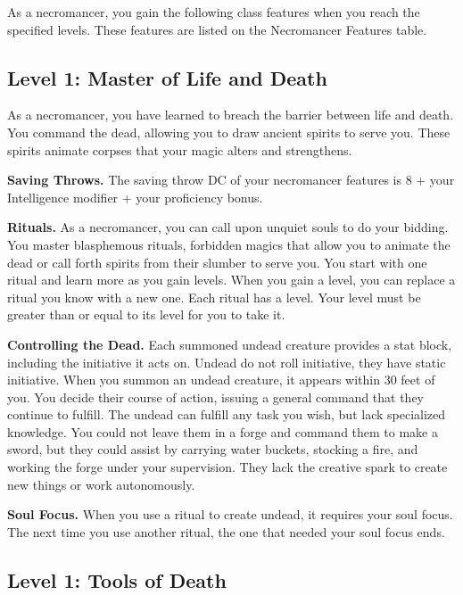 \documentclass[12pt,letterpaper,twocolumn,openany,nodeprecatedcode,bg=none]{dndbook}
\begin{document}
As a necromancer, you gain the following class features when you reach
the specified levels. These features are listed on the Necromancer
Features table.

\subsection{Level 1: Master of Life and
Death}\label{level-1-master-of-life-and-death}

As a necromancer, you have learned to breach the barrier between life
and death. You command the dead, allowing you to draw ancient spirits to
serve you. These spirits animate corpses that your magic alters and
strengthens.

\textbf{Saving Throws.} The saving throw DC of your necromancer features
is 8 + your Intelligence modifier + your proficiency bonus.

\textbf{Rituals.} As a necromancer, you can call upon unquiet souls to
do your bidding. You master blasphemous rituals, forbidden magics that
allow you to animate the dead or call forth spirits from their slumber
to serve you. You start with one ritual and learn more as you gain
levels. When you gain a level, you can replace a ritual you know with a
new one. Each ritual has a level. Your level must be greater than or
equal to its level for you to take it.

\textbf{Controlling the Dead.} Each summoned undead creature provides a
stat block, including the initiative it acts on. Undead do not roll
initiative, they have static initiative. When you summon an undead
creature, it appears within 30 feet of you. You decide their course of
action, issuing a general command that they continue to fulfill. The
undead can fulfill any task you wish, but lack specialized knowledge.
You could not leave them in a forge and command them to make a sword,
but they could assist by carrying water buckets, stocking a fire, and
working the forge under your supervision. They lack the creative spark
to create new things or work autonomously.

\textbf{Soul Focus.} When you use a ritual to create undead, it requires
your soul focus. The next time you use another ritual, the one that
needed your soul focus ends.

\subsection{Level 1: Tools of Death}\label{level-1-tools-of-death}
\end{document}
